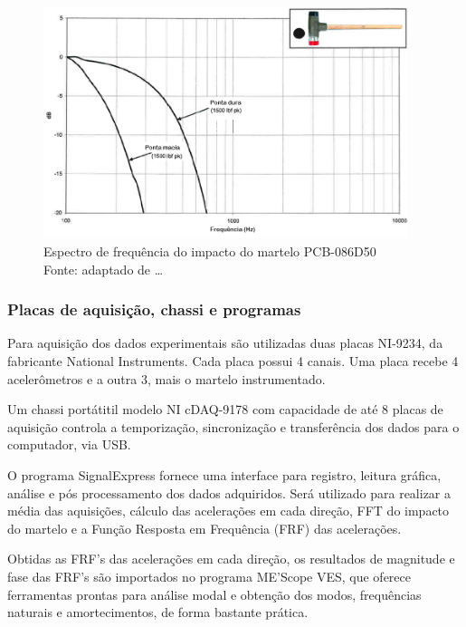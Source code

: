 \begin{figure}[h]
	\centering 
 	\includegraphics[width=0.95\textwidth]{figs/carta_badwidth}
 	\caption[Espectro de frequência do impacto do martelo PCB-086D50]{Espectro de
 	frequência do impacto do martelo PCB-086D50 \\
 	Fonte: adaptado de \ldots }
 	\label{fig::carta_badwidth} 
\end{figure}


\subsubsection{Placas de aquisição, chassi e programas}

Para aquisição dos dados experimentais são utilizadas duas placas NI-9234, da
fabricante National Instruments. Cada placa possui 4 canais. Uma placa recebe 4
acelerômetros e a outra 3, mais o martelo instrumentado.

Um chassi portátitil modelo NI cDAQ-9178 com capacidade de até 8 placas
de aquisição controla a temporização, sincronização e transferência dos dados
para o computador, via USB. 

O programa SignalExpress fornece uma interface para registro, leitura gráfica,
análise e pós processamento dos dados adquiridos. Será utilizado para realizar
a média das aquisições, cálculo das acelerações em cada direção, FFT do impacto
do martelo e a Função Resposta em Frequência (FRF) das acelerações.

Obtidas as FRF's das acelerações em cada direção, os resultados de
magnitude e fase das FRF's são importados no programa ME'Scope VES, que oferece
ferramentas prontas para análise modal e obtenção dos modos, frequências
naturais e amortecimentos, de forma bastante prática.

